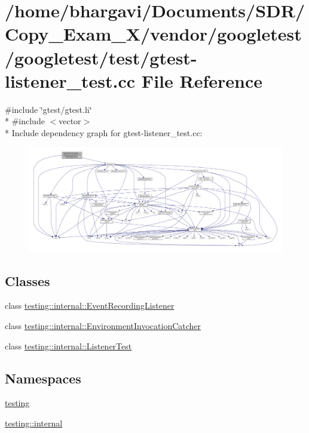 \hypertarget{gtest-listener__test_8cc}{}\section{/home/bhargavi/\+Documents/\+S\+D\+R/\+Copy\+\_\+\+Exam\+\_\+X/vendor/googletest/googletest/test/gtest-\/listener\+\_\+test.cc File Reference}
\label{gtest-listener__test_8cc}
{\ttfamily \#include \char`\"{}gtest/gtest.\+h\char`\"{}}\\*
{\ttfamily \#include $<$vector$>$}\\*
Include dependency graph for gtest-\/listener\+\_\+test.cc\+:
\nopagebreak
\begin{figure}[H]
\begin{center}
\leavevmode
\includegraphics[width=350pt]{gtest-listener__test_8cc__incl}
\end{center}
\end{figure}
\subsection*{Classes}
\begin{DoxyCompactItemize}
\item 
class \hyperlink{classtesting_1_1internal_1_1_event_recording_listener}{testing\+::internal\+::\+Event\+Recording\+Listener}
\item 
class \hyperlink{classtesting_1_1internal_1_1_environment_invocation_catcher}{testing\+::internal\+::\+Environment\+Invocation\+Catcher}
\item 
class \hyperlink{classtesting_1_1internal_1_1_listener_test}{testing\+::internal\+::\+Listener\+Test}
\end{DoxyCompactItemize}
\subsection*{Namespaces}
\begin{DoxyCompactItemize}
\item 
 \hyperlink{namespacetesting}{testing}
\item 
 \hyperlink{namespacetesting_1_1internal}{testing\+::internal}
\end{DoxyCompactItemize}

